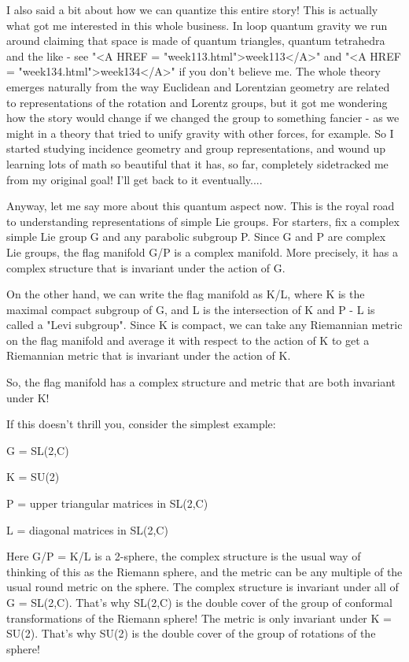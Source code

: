 I also said a bit about how we can quantize this entire story!  This is
actually what got me interested in this whole business.  In loop quantum
gravity we run around claiming that space is made of quantum triangles,
quantum tetrahedra and the like - see "<A HREF = "week113.html">week113</A>" and "<A HREF = "week134.html">week134</A>" if you
don't believe me.  The whole theory emerges naturally from the way
Euclidean and Lorentzian geometry are related to representations of the
rotation and Lorentz groups, but it got me wondering how the story
would change if we changed the group to something fancier - as we might
in a theory that tried to unify gravity with other forces, for example.
So I started studying incidence geometry and group representations, and 
wound up learning lots of math so beautiful that it has, so far, completely
sidetracked me from my original goal!  I'll get back to it eventually....

Anyway, let me say more about this quantum aspect now.  This is the
royal road to understanding representations of simple Lie groups.  For
starters, fix a complex simple Lie group G and any parabolic subgroup
P.  Since G and P are complex Lie groups, the flag manifold G/P is a
complex manifold.  More precisely, it has a complex structure that is
invariant under the action of G.

On the other hand, we can write the flag manifold as K/L, where K is the
maximal compact subgroup of G, and L is the intersection of K and P -
L is called a "Levi subgroup".  Since K is compact, we can take any
Riemannian metric on the flag manifold and average it with respect to 
the action of K to get a Riemannian metric that is invariant under the
action of K.

So, the flag manifold has a complex structure and metric that are both
invariant under K!

If this doesn't thrill you, consider the simplest example:

G = SL(2,C)

K = SU(2)

P = {upper triangular matrices in SL(2,C)}

L = {diagonal matrices in SL(2,C)}

Here G/P = K/L is a 2-sphere, the complex structure is the usual way of
thinking of this as the Riemann sphere, and the metric can be any
multiple of the usual round metric on the sphere.  The complex structure
is invariant under all of G = SL(2,C).  That's why SL(2,C) is the double
cover of the group of conformal transformations of the Riemann sphere!
The metric is only invariant under K = SU(2).  That's why SU(2) is the
double cover of the group of rotations of the sphere!

